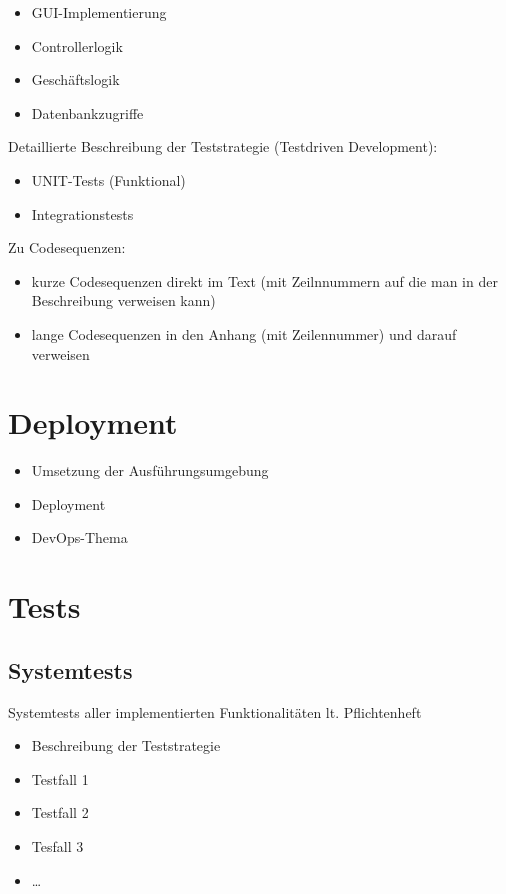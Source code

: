 \begin{itemize}
	\item GUI-Implementierung
	\item Controllerlogik
	\item Geschäftslogik
	\item Datenbankzugriffe
\end{itemize}

Detaillierte Beschreibung der Teststrategie (Testdriven Development):

\begin{itemize}
	\item UNIT-Tests (Funktional)
	\item Integrationstests
\end{itemize}

Zu Codesequenzen:
\begin{itemize}
	\item kurze Codesequenzen direkt im Text (mit Zeilnnummern auf die man in der Beschreibung verweisen kann)
	\item lange Codesequenzen in den Anhang (mit Zeilennummer) und darauf verweisen
\end{itemize}

\chapter{Deployment}
\begin{itemize}
	\item Umsetzung der Ausführungsumgebung
	\item Deployment
	\item DevOps-Thema
\end{itemize}

\chapter{Tests}

\section{Systemtests}
Systemtests aller implementierten Funktionalitäten lt. Pflichtenheft
\begin{itemize}
	\item Beschreibung der Teststrategie
	\item Testfall 1
	\item Testfall 2
	\item Tesfall 3
	\item …
\end{itemize}

